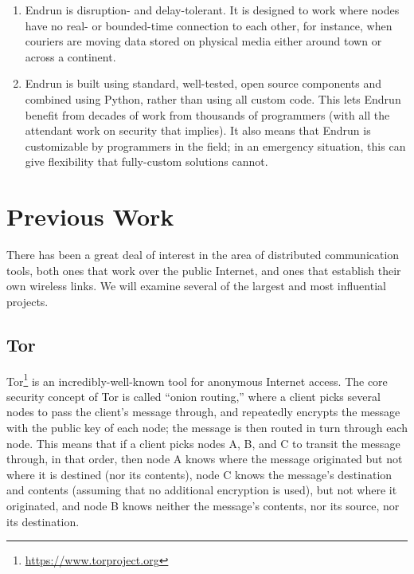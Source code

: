 \documentclass[12pt]{article}
\begin{document}
\begin{enumerate}
    \item Endrun is disruption- and delay-tolerant. It is designed to work where nodes have no real- or bounded-time connection to each other, for instance, when couriers are moving data stored on physical media either around town or across a continent.
    
    \item Endrun is built using standard, well-tested, open source components and combined using Python, rather than using all custom code. This lets Endrun benefit from decades of work from thousands of programmers (with all the attendant work on security that implies). It also means that Endrun is customizable by programmers in the field; in an emergency situation, this can give flexibility that fully-custom solutions cannot.
    
  \end{enumerate}
  
  \section{Previous Work}
  
  There has been a great deal of interest in the area of distributed communication tools, both ones that work over the public Internet, and ones that establish their own wireless links. We will examine several of the largest and most influential projects.
  
  \subsection{Tor}
  
  Tor\footnote{\url{https://www.torproject.org}} is an incredibly-well-known tool for anonymous Internet access. The core security concept of Tor is called ``onion routing,'' where a client picks several nodes to pass the client's message through, and repeatedly encrypts the message with the public key of each node; the message is then routed in turn through each node. This means that if a client picks nodes A, B, and C to transit the message through, in that order, then node A knows where the message originated but not where it is destined (nor its contents), node C knows the message's destination and contents (assuming that no additional encryption is used), but not where it originated, and node B knows neither the message's contents, nor its source, nor its destination.
  
\end{document}
